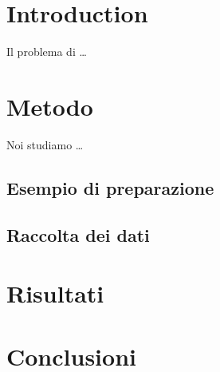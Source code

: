 \documentclass{article}
\begin{document}
\section{Introduction}

Il problema di \ldots

\section{Metodo}

Noi studiamo \ldots

\subsection{Esempio di preparazione}

\subsection{Raccolta dei dati}

\section{Risultati}

\section{Conclusioni}
\end{document}
